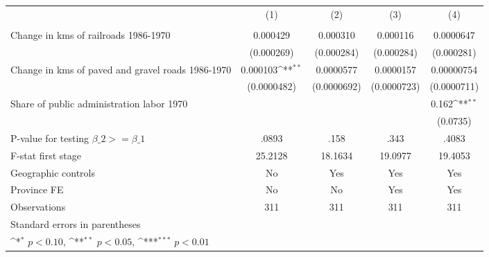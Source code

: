 {
\def\sym#1{\ifmmode^{#1}\else\(^{#1}\)\fi}
\begin{tabular}{l*{4}{c}}
\hline\hline
                &\multicolumn{1}{c}{(1)}&\multicolumn{1}{c}{(2)}&\multicolumn{1}{c}{(3)}&\multicolumn{1}{c}{(4)}\\
                &\multicolumn{1}{c}{}&\multicolumn{1}{c}{}&\multicolumn{1}{c}{}&\multicolumn{1}{c}{}\\
\hline
Change in kms of railroads 1986-1970& 0.000429         & 0.000310         & 0.000116         &0.0000647         \\
                &(0.000269)         &(0.000284)         &(0.000284)         &(0.000281)         \\
[1em]
Change in kms of paved and gravel roads 1986-1970& 0.000103\sym{**} &0.0000577         &0.0000157         &0.00000754         \\
                &(0.0000482)         &(0.0000692)         &(0.0000723)         &(0.0000711)         \\
[1em]
Share of public administration labor 1970&                  &                  &                  &    0.162\sym{**} \\
                &                  &                  &                  & (0.0735)         \\
\hline
P-value for testing $\beta\_{2} >= \beta\_{1}$&    .0893         &     .158         &     .343         &    .4083         \\
F-stat first stage&  25.2128         &  18.1634         &  19.0977         &  19.4053         \\
Geographic controls&       No         &      Yes         &      Yes         &      Yes         \\
Province FE     &       No         &       No         &      Yes         &      Yes         \\
Observations    &      311         &      311         &      311         &      311         \\
\hline\hline
\multicolumn{5}{l}{\footnotesize Standard errors in parentheses}\\
\multicolumn{5}{l}{\footnotesize \sym{*} \(p<0.10\), \sym{**} \(p<0.05\), \sym{***} \(p<0.01\)}\\
\end{tabular}
}
